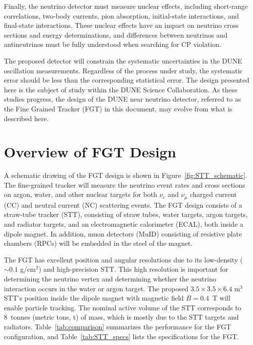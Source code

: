 Finally, the neutrino detector must measure nuclear effects, including
short-range correlations, two-body currents, pion absorption, initial-state interactions, 
and final-state interactions. These nuclear effects 
have an impact on neutrino cross sections and energy determinations, and differences
between neutrinos and antineutrinos must be fully understood when searching
for CP violation.

The proposed detector will constrain the systematic uncertainties in the DUNE 
oscillation measurements. Regardless of the process under study, the 
systematic error should be less than the corresponding statistical error. 
The design presented here is the subject of study within the DUNE Science 
Collaboration. As these studies 
progress, the design of the DUNE near neutrino detector, 
referred to as the Fine Grained Tracker (FGT) in this document, may 
evolve from what is described here. 

\section{Overview of FGT Design}
\label{sec:nd-nnd-fgt}

A schematic drawing of the 
FGT design is shown in Figure~\ref{fig:STT_schematic}. 
The fine-grained tracker %
will measure the neutrino event rates and cross sections 
on argon, water, and other nuclear 
targets for both $\nu_e$ and $\nu_\mu$ charged current (CC) and
neutral current (NC) scattering events. The FGT design 
consists of a straw-tube tracker (STT), consisting of straw tubes, water targets, argon targets, 
and radiator targets, and an electromagnetic calorimeter (ECAL), both inside a
dipole magnet. In addition, muon detectors (MuID) consisting of resistive plate
chambers (RPCs) will be embedded in the steel
of the magnet. 

The FGT has excellent position and angular resolutions due to
its low-density ($\sim0.1$ g/cm$^2$) and high-precision STT. This high 
resolution is important for determining the neutrino
vertex and determining whether the neutrino interaction occurs in the water
or argon target.  The
proposed $3.5\times3.5\times6.4$ m$^3$ STT's position inside the 
dipole magnet with magnetic field $B = 0.4$~T will enable particle tracking. %
The nominal active volume of the STT corresponds to 8~tonnes (metric tons, t) of mass, 
which is mostly due to the STT targets and radiators. 
Table~\ref{tab:comparison} summarizes the
performance for the FGT configuration, and
Table~\ref{tab:STT_specs} lists the specifications for the FGT. %

